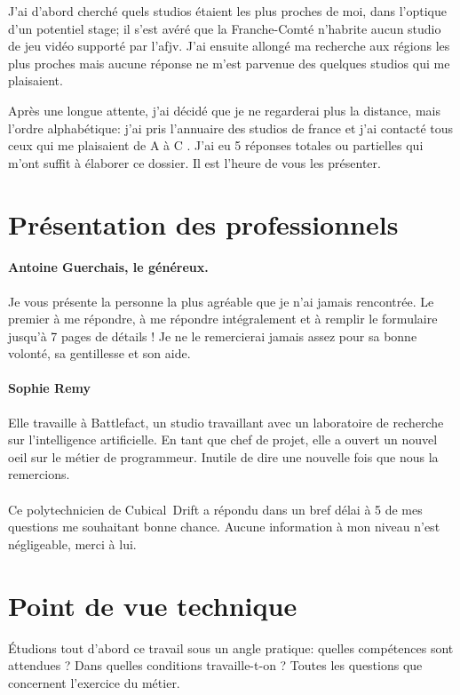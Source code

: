 \documentclass[12pt, a4paper]{report} %
\begin{document}
J'ai d'abord cherché quels studios étaient les plus proches de moi, dans l'optique d'un potentiel stage; il s'est avéré que la Franche-Comté n'habrite aucun studio de jeu vidéo supporté par l'\acrshort{afjv}. J'ai ensuite allongé ma recherche aux régions les plus proches mais aucune réponse ne m'est parvenue des quelques studios qui me plaisaient.

Après une longue attente, j'ai décidé que je ne regarderai plus la distance, mais l'ordre alphabétique: j'ai pris l'annuaire des studios de france et j'ai contacté tous ceux qui me plaisaient de A à C . J'ai eu 5 réponses totales ou partielles qui m'ont suffit à élaborer ce dossier. Il est l'heure de vous les présenter.

\section{Présentation des professionnels}
\paragraph{Antoine Guerchais, le généreux.}
Je vous présente la personne la plus agréable que je n'ai jamais rencontrée. Le premier à me répondre, à me répondre intégralement et à remplir le formulaire jusqu'à 7 pages de détails ! Je ne le remercierai jamais assez pour sa bonne volonté, sa gentillesse et son aide. 

\paragraph{Sophie Remy}
Elle travaille à Battlefact, un studio travaillant avec un laboratoire de recherche sur l'intelligence artificielle. En tant que chef de projet, elle a ouvert un nouvel oeil sur le métier de programmeur. Inutile de dire une nouvelle fois que nous la remercions.

\paragraph{\cubical{}}
Ce polytechnicien de Cubical~Drift  a répondu dans un bref délai à 5 de mes questions me souhaitant bonne chance. Aucune information à mon niveau n'est négligeable, merci à lui.

\section{Point de vue technique}
Étudions tout d'abord ce travail sous un angle pratique: quelles compétences sont attendues ? Dans quelles conditions travaille-t-on ? Toutes les questions que concernent l'exercice du métier.
\end{document}
